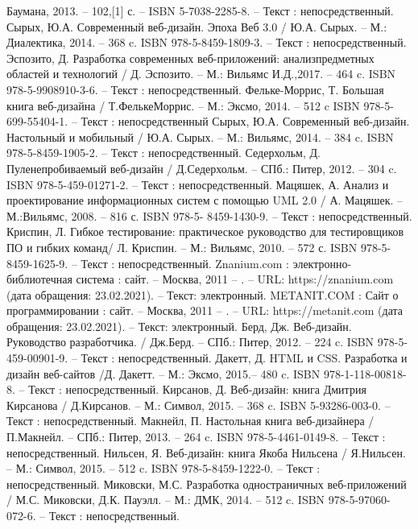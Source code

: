 \begin{thebibliography}{9}
		Баумана, 2013. – 102,[1] с. – ISBN 5-7038-2285-8. – Текст : непосредственный.
		Сырых, Ю.А. Современный веб-дизайн. Эпоха Веб 3.0 / Ю.А. Сырых. – М.: Диалектика, 2014. – 368 c. ISBN 978-5-8459-1809-3. – Текст : непосредственный.
		Эспозито, Д. Разработка современных веб-приложений: анализпредметных областей и технологий / Д. Эспозито. – М.: Вильямс И.Д.,2017. – 464 c. ISBN 978-5-9908910-3-6. – Текст : непосредственный.
		Фельке-Моррис, Т. Большая книга веб-дизайна / Т.ФелькеМоррис. – М.: Эксмо, 2014. – 512 c ISBN 978-5-699-55404-1. – Текст : непосредственный
		Сырых, Ю.А. Современный веб-дизайн. Настольный и мобильный / Ю.А. Сырых. – М.: Вильямс, 2014. – 384 c. ISBN 978-5-8459-1905-2. – Текст : непосредственный.
		Седерхольм, Д. Пуленепробиваемый веб-дизайн / Д.Седерхольм. – СПб.: Питер, 2012. – 304 c. ISBN 978-5-459-01271-2. – Текст : непосредственный.
		Мацяшек, А. Анализ и проектирование информационных систем с помощью UML 2.0 / А. Мацяшек. – М.:Вильямс, 2008. – 816 с. ISBN 978-5-	8459-1430-9. – Текст : непосредственный.
		Криспин, Л. Гибкое тестирование: практическое руководство для тестировщиков ПО и гибких команд/ Л. Криспин. – М.: Вильямс, 2010. – 572 с. ISBN 978-5-8459-1625-9. – Текст : непосредственный.
		Znanium.com : электронно-библиотечная система : сайт. – Москва, 2011 – . – URL: https://znanium.com (дата обращения: 23.02.2021). – Текст: электронный.
		METANIT.COM : Сайт о программировании : сайт. – Москва, 2011 – . – URL: https://metanit.com (дата обращения: 23.02.2021). – Текст: электронный.
	Берд, Дж. Веб-дизайн. Руководство разработчика. / Дж.Берд. – СПб.: Питер, 2012. – 224 c. ISBN 978-5-459-00901-9. – Текст : непосредственный.
		Дакетт, Д. HTML и CSS. Разработка и дизайн веб-сайтов /Д. Дакетт. – М.: Эксмо, 2015.– 480 c. ISBN 978-1-118-00818-8. – Текст : непосредственный.
		Кирсанов, Д. Веб-дизайн: книга Дмитрия Кирсанова / Д.Кирсанов. – М.: Символ, 2015. – 368 c. ISBN 5-93286-003-0. – Текст : непосредственный.
		Макнейл, П. Настольная книга веб-дизайнера / П.Макнейл. – СПб.: Питер, 2013. – 264 c. ISBN 978-5-4461-0149-8. – Текст : непосредственный.
		Нильсен, Я. Веб-дизайн: книга Якоба Нильсена / Я.Нильсен. – М.: Символ, 2015. – 512 c. ISBN 978-5-8459-1222-0. – Текст : непосредственный.
		Миковски, М.С. Разработка одностраничных веб-приложений / М.С. Миковски, Д.К. Пауэлл. – М.: ДМК, 2014. – 512 c. ISBN 978-5-97060- 072-6. – Текст : непосредственный.
\end{thebibliography}
